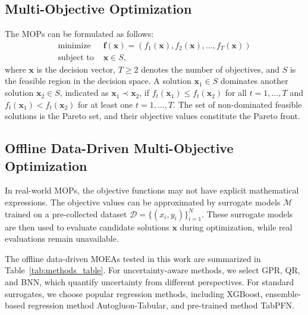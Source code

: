 \documentclass[conference]{IEEEtran}
\begin{document}
\subsection{Multi-Objective Optimization}
The \gls{MOPs} can be formulated as follows:
\begin{align}\label{eq:mops}
\text{minimize }& \boldsymbol{f}(\mathbf{x}) = \left(f_1(\mathbf{x}), f_2(\mathbf{x}), \ldots, f_T(\mathbf{x})\right) \nonumber \\
\text{subject to }& \mathbf{x} \in S ,
\end{align}
where $\mathbf{x}$ is the decision vector, $T \geq 2$ denotes the number of objectives, and $S$ is the feasible region in the decision space. A solution $\mathbf{x}_1 \in S$ dominates another solution $\mathbf{x}_2 \in S$, indicated as $\mathbf{x}_1 \prec \mathbf{x}_2$, if $f_t(\mathbf{x}_1) \leq f_t(\mathbf{x}_2)$ for all $t=1,\ldots,T$ and $f_t(\mathbf{x}_{1}) < f_t(\mathbf{x}_{2})$ for at least one $t = 1,\ldots,T$. The set of non-dominated feasible solutions is the Pareto set, and their objective values constitute the Pareto front.

\subsection{Offline Data-Driven Multi-Objective Optimization}
In real-world \gls{MOPs}, the objective functions may not have explicit mathematical expressions. The objective values can be approximated by surrogate models $\mathcal{M}$ trained on a pre-collected dataset $\mathcal{D} = \{(x_i, y_i)\}_{i=1}^{N}$. These surrogate models are then used to evaluate candidate solutions $\mathbf{x}$ during optimization, while real evaluations remain unavailable.

The offline data-driven \gls{MOEAs} tested in this work are summarized in Table~\ref{tab:methods_table}. For uncertainty-aware methods, we select GPR, QR, and BNN, which quantify uncertainty from different perspectives. For standard surrogates, we choose popular regression methods, including XGBoost, ensemble-based regression method Autogluon-Tabular, and pre-trained method TabPFN.
\end{document}
